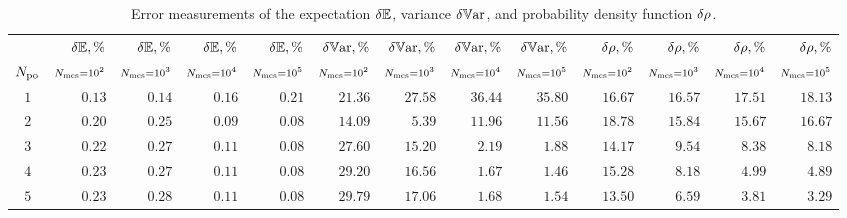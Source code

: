 \begin{table*}
  \centering
  \caption{Error measurements of the expectation $\delta\mathbb{E}$, variance $\delta\mathbb{V}\text{ar}$, and probability density function $\delta\rho$.}
  \begin{tabular}{c@{\psep}r@{\csep}r@{\csep}r@{\csep}r@{\psep}r@{\csep}r@{\csep}r@{\csep}r@{\psep}r@{\csep}r@{\csep}r@{\csep}r}
    \toprule
    {} & $\delta\mathbb{E}, \%$ & $\delta\mathbb{E}, \%$ & $\delta\mathbb{E}, \%$ & $\delta\mathbb{E}, \%$ & $\delta\mathbb{V}\text{ar}, \%$ & $\delta\mathbb{V}\text{ar}, \%$ & $\delta\mathbb{V}\text{ar}, \%$ & $\delta\mathbb{V}\text{ar}, \%$ & $\delta\rho, \%$ & $\delta\rho, \%$ & $\delta\rho, \%$ & $\delta\rho, \%$ \\
    ${N_\text{po}}$ & $\scriptstyle N_\text{mcs} = 10^2$ & $\scriptstyle N_\text{mcs} = 10^3$ & $\scriptstyle N_\text{mcs} = 10^4$ & $\scriptstyle N_\text{mcs} = 10^5$ & $\scriptstyle N_\text{mcs} = 10^2$ & $\scriptstyle N_\text{mcs} = 10^3$ & $\scriptstyle N_\text{mcs} = 10^4$ & $\scriptstyle N_\text{mcs} = 10^5$ & $\scriptstyle N_\text{mcs} = 10^2$ & $\scriptstyle N_\text{mcs} = 10^3$ & $\scriptstyle N_\text{mcs} = 10^4$ & $\scriptstyle N_\text{mcs} = 10^5$ \\
    \cmidrule(r{10pt}){1-1}
    \cmidrule(r{10pt}){2-5}
    \cmidrule(r{10pt}){6-9}
    \cmidrule{10-13}
    $1$ & $0.13$ & $0.14$ & $0.16$ & $0.21$ & $21.36$ & $27.58$ & $36.44$ & $35.80$ & $16.67$ & $16.57$ & $17.51$ & $18.13$ \\
    $2$ & $0.20$ & $0.25$ & $0.09$ & $0.08$ & $14.09$ & $ 5.39$ & $11.96$ & $11.56$ & $18.78$ & $15.84$ & $15.67$ & $16.67$ \\
    $3$ & $0.22$ & $0.27$ & $0.11$ & $0.08$ & $27.60$ & $15.20$ & $ 2.19$ & $ 1.88$ & $14.17$ & $ 9.54$ & $ 8.38$ & $ 8.18$ \\
    $4$ & $0.23$ & $0.27$ & $0.11$ & $0.08$ & $29.20$ & $16.56$ & $ 1.67$ & $ 1.46$ & $15.28$ & $ 8.18$ & $ 4.99$ & $ 4.89$ \\
    $5$ & $0.23$ & $0.28$ & $0.11$ & $0.08$ & $29.79$ & $17.06$ & $ 1.68$ & $ 1.54$ & $13.50$ & $ 6.59$ & $ 3.81$ & $ 3.29$ \\
    \bottomrule
  \end{tabular}
  \vspace{-15pt}
\end{table*}
